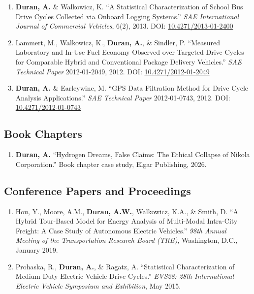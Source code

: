 \documentclass[11pt,letterpaper]{article}
\begin{document}
\begin{enumerate}
  \item \textbf{Duran, A.} \& Walkowicz, K.
        ``A Statistical Characterization of School Bus Drive Cycles Collected via Onboard
        Logging Systems.''
        \textit{SAE International Journal of Commercial Vehicles}, 6(2), 2013.
        DOI: \href{https://doi.org/10.4271/2013-01-2400}{10.4271/2013-01-2400}

  \item Lammert, M., Walkowicz, K., \textbf{Duran, A.}, \& Sindler, P.
        ``Measured Laboratory and In-Use Fuel Economy Observed over Targeted Drive Cycles
        for Comparable Hybrid and Conventional Package Delivery Vehicles.''
        \textit{SAE Technical Paper} 2012-01-2049, 2012.
        DOI: \href{https://doi.org/10.4271/2012-01-2049}{10.4271/2012-01-2049}

  \item \textbf{Duran, A.} \& Earleywine, M.
        ``GPS Data Filtration Method for Drive Cycle Analysis Applications.''
        \textit{SAE Technical Paper} 2012-01-0743, 2012.
        DOI: \href{https://doi.org/10.4271/2012-01-0743}{10.4271/2012-01-0743}
\end{enumerate}

\subsection{Book Chapters}

\begin{enumerate}
  \item \textbf{Duran, A.}
        ``Hydrogen Dreams, False Claims: The Ethical Collapse of Nikola Corporation.''
        Book chapter case study, Elgar Publishing, 2026.
\end{enumerate}

\subsection{Conference Papers and Proceedings}

\begin{enumerate}
  \item Hou, Y., Moore, A.M., \textbf{Duran, A.W.}, Walkowicz, K.A., \& Smith, D.
        ``A Hybrid Tour-Based Model for Energy Analysis of Multi-Modal Intra-City Freight:
        A Case Study of Autonomous Electric Vehicles.''
        \textit{98th Annual Meeting of the Transportation Research Board (TRB)},
        Washington, D.C., January 2019.

  \item Prohaska, R., \textbf{Duran, A.}, \& Ragatz, A.
        ``Statistical Characterization of Medium-Duty Electric Vehicle Drive Cycles.''
        \textit{EVS28: 28th International Electric Vehicle Symposium and Exhibition},
        May 2015.
\end{enumerate}
\end{document}
